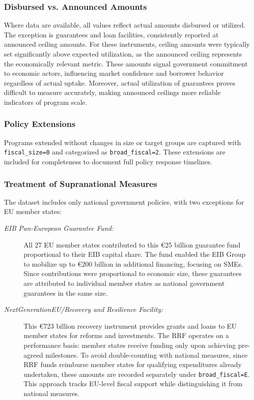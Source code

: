 \documentclass[12pt]{article}
\begin{document}
\subsubsection{Disbursed vs. Announced Amounts}

Where data are available, all values reflect actual amounts disbursed or utilized. The exception is guarantees and loan facilities, consistently reported at announced ceiling amounts. For these instruments, ceiling amounts were typically set significantly above expected utilization, as the announced ceiling represents the economically relevant metric. These amounts signal government commitment to economic actors, influencing market confidence and borrower behavior regardless of actual uptake. Moreover, actual utilization of guarantees proves difficult to measure accurately, making announced ceilings more reliable indicators of program scale.

\subsubsection{Policy Extensions}

Programs extended without changes in size or target groups are captured with \texttt{fiscal\_size=0} and categorized as \texttt{broad\_fiscal=2}. These extensions are included for completeness to document full policy response timelines.

\subsubsection{Treatment of Supranational Measures}

The dataset includes only national government policies, with two exceptions for EU member states:
\begin{description}
  \item[\textit{EIB Pan-European Guarantee Fund:}]
  All 27 EU member states contributed to this €25 billion guarantee fund
  proportional to their EIB capital share. The fund enabled the EIB Group
  to mobilize up to €200 billion in additional financing, focusing on SMEs.
  Since contributions were proportional to economic size, these guarantees
  are attributed to individual member states as national government guarantees in the same size.
\end{description}

\begin{description}
    \item[\textit{NextGenerationEU/Recovery and Resilience Facility:}] 
    This €723 billion recovery instrument provides grants and loans to EU member states for reforms and investments. The RRF operates on a performance basis: member states receive funding only upon achieving pre-agreed milestones. To avoid double-counting with national measures, since RRF funds reimburse member states for qualifying expenditures already undertaken, these amounts are recorded separately under \texttt{broad\_fiscal=E}. This approach tracks EU-level fiscal support while distinguishing it from national measures.

\end{description}
\end{document}
